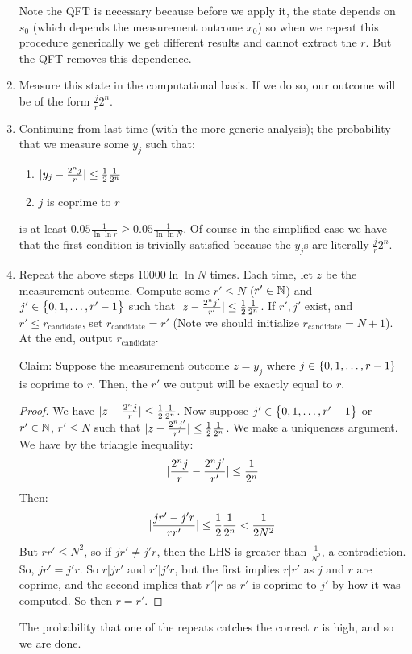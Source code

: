\begin{enumerate}
    Note the QFT is necessary because before we apply it, the state depends on $s_0$ (which depends the measurement outcome $x_0$) so when we repeat this procedure generically we get different results and cannot extract the $r$. But the QFT removes this dependence.
    \item Measure this state in the computational basis. If we do so, our outcome will be of the form $\frac{j}{r}2^n$. 
    \item Continuing from last time (with the more generic analysis); the probability that we measure some $y_j$ such that:
    \begin{enumerate}
        \item $\lvert y_j - \frac{2^nj}{r} \rvert \leq \frac{1}{2}\frac{1}{2^n}$
        \item $j$ is coprime to $r$
    \end{enumerate}
    is at least $0.05\frac{1}{\ln\ln r} \geq 0.05\frac{1}{\ln\ln N}$. Of course in the simplified case we have that the first condition is trivially satisfied because the $y_j$s are literally $\frac{j}{r}2^n$.
    \item Repeat the above steps $10000\ln\ln N$ times. Each time, let $z$ be the measurement outcome. Compute some $r' \leq N$ ($r' \in \mathbb{N}$) and $j' \in \set{0, 1, \ldots, r'-1}$ such that $\lvert z - \frac{2^nj'}{r'} \rvert \leq \frac{1}{2}\frac{1}{2^n}$. If $r', j'$ exist, and $r' \leq r_{\text{candidate}}$, set $r_{\text{candidate}} = r'$ (Note we should initialize $r_{\text{candidate}} = N + 1$). At the end, output $r_{\text{candidate}}$.
    
    Claim: Suppose the measurement outcome $z = y_j$ where $j \in \set{0, 1, \ldots, r-1}$ is coprime to $r$. Then, the $r'$ we output will be exactly equal to $r$.
    \begin{proof}
        We have $\lvert z - \frac{2^nj}{r} \rvert \leq \frac{1}{2}\frac{1}{2^n}$. Now suppose $j' \in \set{0, 1, \ldots, r'-1}$ or $r' \in \mathbb{N}$, $r' \leq N$ such that $\lvert z - \frac{2^nj'}{r'} \rvert \leq \frac{1}{2}\frac{1}{2^n}$. We make a uniqueness argument. We have by the triangle inequality:
        \begin{equation}
            \lvert \frac{2^nj}{r} - \frac{2^nj'}{r'} \rvert \leq \frac{1}{2^n}
        \end{equation}
        Then:
        \begin{equation}
            \lvert \frac{jr' - j'r}{rr'} \rvert \leq \frac{1}{2}\frac{1}{2^n} < \frac{1}{2N^2}
        \end{equation}
        But $rr' \leq N^2$, so if $jr' \neq j'r$, then the LHS is greater than $\frac{1}{N^2}$, a contradiction. So, $jr' = j'r$. So $r \vert jr'$ and $r' \vert j'r$, but the first implies $r \vert r'$ as $j$ and $r$ are coprime, and the second implies that $r' \vert r$ as $r'$ is coprime to $j'$ by how it was computed. So then $r = r'$.
    \end{proof}

    The probability that one of the repeats catches the correct $r$ is high, and so we are done.
\end{enumerate}

